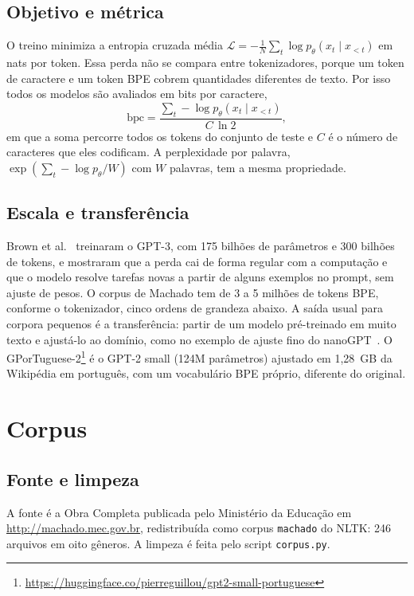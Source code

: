 \documentclass[conference]{IEEEtran}
\begin{document}
\subsection{Objetivo e métrica}

O treino minimiza a entropia cruzada média $\mathcal{L}=-\frac{1}{N}\sum_t \log p_\theta(x_t\mid x_{<t})$ em nats por token. Essa perda não se compara entre tokenizadores, porque um token de caractere e um token BPE cobrem quantidades diferentes de texto. Por isso todos os modelos são avaliados em bits por caractere,
\begin{equation}
\mathrm{bpc}=\frac{\sum_t -\log p_\theta(x_t\mid x_{<t})}{C\,\ln 2},
\end{equation}
em que a soma percorre todos os tokens do conjunto de teste e $C$ é o número de caracteres que eles codificam. A perplexidade por palavra, $\exp(\sum_t -\log p_\theta/W)$ com $W$ palavras, tem a mesma propriedade.

\subsection{Escala e transferência}

Brown et al.~\cite{brown2020gpt3} treinaram o GPT-3, com 175 bilhões de parâmetros e 300 bilhões de tokens, e mostraram que a perda cai de forma regular com a computação e que o modelo resolve tarefas novas a partir de alguns exemplos no prompt, sem ajuste de pesos. O corpus de Machado tem de 3 a 5 milhões de tokens BPE, conforme o tokenizador, cinco ordens de grandeza abaixo. A saída usual para corpora pequenos é a transferência: partir de um modelo pré-treinado em muito texto e ajustá-lo ao domínio, como no exemplo de ajuste fino do nanoGPT~\cite{karpathy2022nanogpt}. O GPorTuguese-2\footnote{\url{https://huggingface.co/pierreguillou/gpt2-small-portuguese}} é o GPT-2 small (124M parâmetros) ajustado em 1,28~GB da Wikipédia em português, com um vocabulário BPE próprio, diferente do original.

\section{Corpus}

\subsection{Fonte e limpeza}

A fonte é a Obra Completa publicada pelo Ministério da Educação em \url{http://machado.mec.gov.br}, redistribuída como corpus \texttt{machado} do NLTK: 246 arquivos em oito gêneros. A limpeza é feita pelo script \texttt{corpus.py}.
\end{document}
